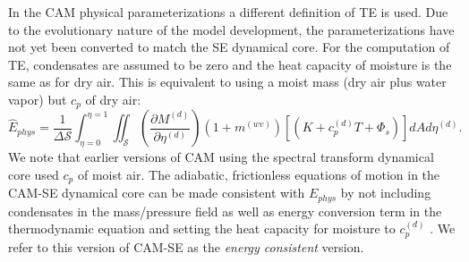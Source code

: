 \documentclass{agujournal}
\newcommand*{\gi}[1]{\widehat{#1}}
\begin{document}
In the CAM physical parameterizations a different definition of TE is used. Due to the evolutionary nature of the model development, the parameterizations have not yet been converted to match the SE dynamical core. For the computation of TE, condensates are assumed to be zero and the heat capacity of moisture is the same as for dry air. This is equivalent to using a moist mass (dry air plus water vapor) but $c_p$ of dry air:
\begin{equation}
\label{eq:Ephys}
\gi{E}_{phys} =\frac{1}{\Delta \mathcal{S}}\int_{\eta=0}^{\eta=1} \iint_\mathcal{S} \left( \frac{\partial M^{(d)}}{\partial \eta^{(d)}} \right)\left(1+m^{(wv)}\right)\left[ \left(K+c_p^{(d)}T+\Phi_s\right)\right]dA d \eta^{(d)}.
\end{equation}
We note that earlier versions of CAM using the spectral transform dynamical core used $c_p$ of moist air. The adiabatic, frictionless equations of motion in the CAM-SE dynamical core can be made consistent with $E_{phys}$ by not including condensates in the mass/pressure field as well as energy conversion term in the thermodynamic equation and setting the heat capacity for moisture to $c_p^{(d)}$ \citep{T2011LNCSEb}. We refer to this version of CAM-SE as the {\em{energy consistent}} version.
\end{document}
